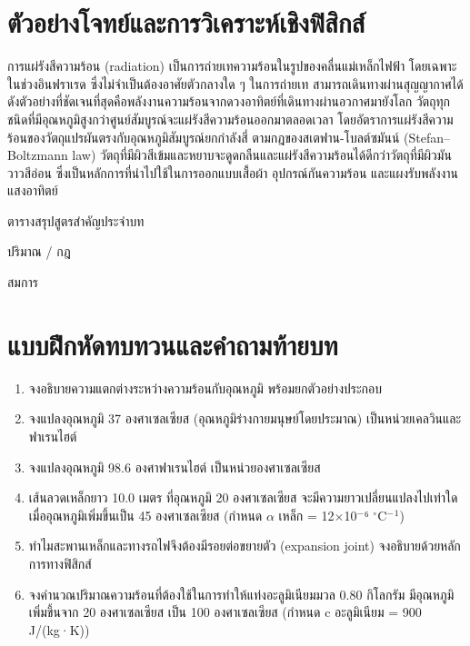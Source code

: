 \section{ตัวอย่างโจทย์และการวิเคราะห์เชิงฟิสิกส์}

\begin{examplebox}
การแผ่รังสีความร้อน (radiation) เป็นการถ่ายเทความร้อนในรูปของคลื่นแม่เหล็กไฟฟ้า โดยเฉพาะในช่วงอินฟราเรด ซึ่งไม่จำเป็นต้องอาศัยตัวกลางใด ๆ ในการถ่ายเท สามารถเดินทางผ่านสุญญากาศได้ ดังตัวอย่างที่ชัดเจนที่สุดคือพลังงานความร้อนจากดวงอาทิตย์ที่เดินทางผ่านอวกาศมายังโลก วัตถุทุกชนิดที่มีอุณหภูมิสูงกว่าศูนย์สัมบูรณ์จะแผ่รังสีความร้อนออกมาตลอดเวลา โดยอัตราการแผ่รังสีความร้อนของวัตถุแปรผันตรงกับอุณหภูมิสัมบูรณ์ยกกำลังสี่ ตามกฎของสเตฟาน-โบลต์ซมันน์ (Stefan–Boltzmann law) วัตถุที่มีผิวสีเข้มและหยาบจะดูดกลืนและแผ่รังสีความร้อนได้ดีกว่าวัตถุที่มีผิวมันวาวสีอ่อน ซึ่งเป็นหลักการที่นำไปใช้ในการออกแบบเสื้อผ้า อุปกรณ์กันความร้อน และแผงรับพลังงานแสงอาทิตย์

ตารางสรุปสูตรสำคัญประจำบท

ปริมาณ / กฎ

สมการ
\end{examplebox}

\section{แบบฝึกหัดทบทวนและคำถามท้ายบท}

\begin{enumerate}
    \item จงอธิบายความแตกต่างระหว่างความร้อนกับอุณหภูมิ พร้อมยกตัวอย่างประกอบ
    \item จงแปลงอุณหภูมิ 37 องศาเซลเซียส (อุณหภูมิร่างกายมนุษย์โดยประมาณ) เป็นหน่วยเคลวินและฟาเรนไฮต์
    \item จงแปลงอุณหภูมิ 98.6 องศาฟาเรนไฮต์ เป็นหน่วยองศาเซลเซียส
    \item เส้นลวดเหล็กยาว 10.0 เมตร ที่อุณหภูมิ 20 องศาเซลเซียส จะมีความยาวเปลี่ยนแปลงไปเท่าใดเมื่ออุณหภูมิเพิ่มขึ้นเป็น 45 องศาเซลเซียส (กำหนด $\alpha$ เหล็ก = 12$\times$10$^-$⁶ $^\circ$C$^-$$^1$)
    \item ทำไมสะพานเหล็กและทางรถไฟจึงต้องมีรอยต่อขยายตัว (expansion joint) จงอธิบายด้วยหลักการทางฟิสิกส์
    \item จงคำนวณปริมาณความร้อนที่ต้องใช้ในการทำให้แท่งอะลูมิเนียมมวล 0.80 กิโลกรัม มีอุณหภูมิเพิ่มขึ้นจาก 20 องศาเซลเซียส เป็น 100 องศาเซลเซียส (กำหนด c อะลูมิเนียม = 900 J/(kg·K))
\end{enumerate}

